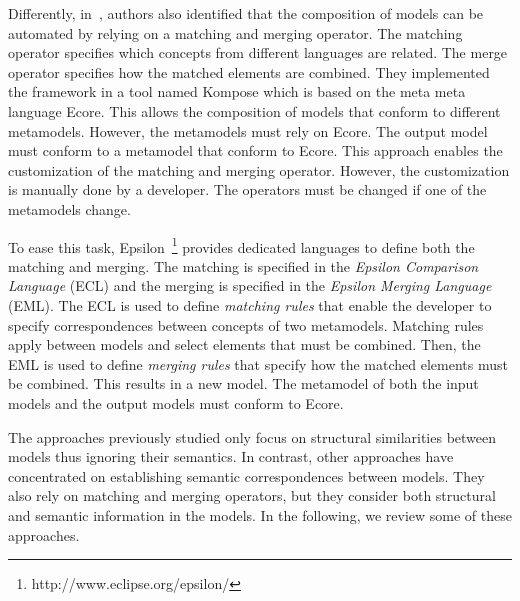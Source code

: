 Differently, in~\cite{kompose}, authors also identified that the composition of models can be automated by relying on a matching and merging operator. The matching operator specifies which concepts from different languages are related. The merge operator specifies how the matched elements are combined. They implemented the framework in a tool named Kompose which is based on the meta meta language Ecore. This allows the composition of models that conform to different metamodels. However, the metamodels must rely on Ecore. The output model must conform to a metamodel that conform to Ecore. This approach enables the customization of the matching and merging operator. However, the customization is manually done by a developer. The operators must be changed if one of the metamodels change. 

To ease this task, Epsilon~\cite{epsilon}\footnote{http://www.eclipse.org/epsilon/} provides dedicated languages to define both the matching and merging. The matching is specified in the \emph{Epsilon Comparison Language} (ECL) and the merging is specified in the \emph{Epsilon Merging Language} (EML). The ECL is used to define \emph{matching rules} that enable the developer to specify correspondences between concepts of two metamodels. Matching rules apply between models and select elements that must be combined. Then, the EML is used to define \emph{merging rules} that specify how the matched elements must be combined. This results in a new model. The metamodel of both the input models and the output models must conform to Ecore.


The approaches previously studied only focus on structural similarities between models thus ignoring their semantics. In contrast, other approaches have concentrated on establishing semantic correspondences between models. They also rely on matching and merging operators, but they consider both structural and semantic information in the models. In the following, we review some of these approaches.  

